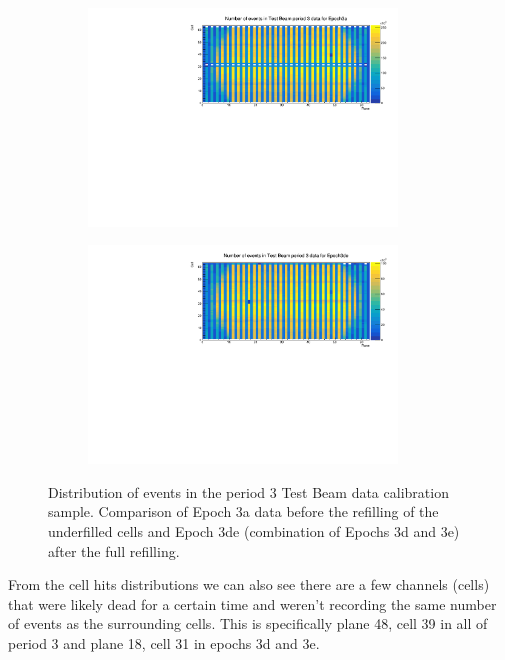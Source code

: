 \documentclass[12pt,a4paper]{article}
\begin{document}
\begin{figure}[!hbtp]
\centering
\begin{subfigure}[b]{\textwidth}
\centering
\includegraphics[width=0.9\textwidth]{Plots/Attenprofs_P3Data_CellPlane_Epoch3a.pdf}
\end{subfigure}
\begin{subfigure}[b]{\textwidth}
\centering
\includegraphics[width=0.9\textwidth]{Plots/Attenprofs_P3Data_CellPlane_Epoch3de.pdf}
\end{subfigure}
\caption{Distribution of events in the period 3 Test Beam data calibration sample. Comparison of Epoch 3a data before the refilling of the underfilled cells and Epoch 3de (combination of Epochs 3d and 3e) after the full refilling.}
\label{figCalibhist_period3}
\end{figure}

From the cell hits distributions we can also see there are a few channels (cells) that were likely dead for a certain time and weren't recording the same number of events as the surrounding cells. This is specifically plane 48, cell 39 in all of period 3 and plane 18, cell 31 in epochs 3d and 3e.
\end{document}
